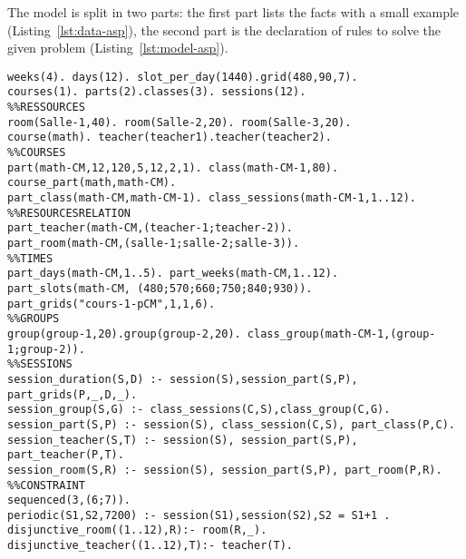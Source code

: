 %
The \ASP{} model is split in two parts: the first part lists the facts with a small example (Listing~\ref{lst:data-asp}), the second part is the declaration of rules to solve the given \UTP{} problem (Listing~\ref{lst:model-asp}).
\begin{lstlisting}[style=PrologStyle, caption={ASP facts}, label={lst:data-asp}]
%%DIMENSIONS
weeks(4). days(12). slot_per_day(1440).grid(480,90,7).
courses(1). parts(2).classes(3). sessions(12).
%%RESSOURCES
room(Salle-1,40). room(Salle-2,20). room(Salle-3,20). 
course(math). teacher(teacher1).teacher(teacher2).
%%COURSES
part(math-CM,12,120,5,12,2,1). class(math-CM-1,80). course_part(math,math-CM).
part_class(math-CM,math-CM-1). class_sessions(math-CM-1,1..12).
%%RESOURCESRELATION
part_teacher(math-CM,(teacher-1;teacher-2)).
part_room(math-CM,(salle-1;salle-2;salle-3)).
%%TIMES
part_days(math-CM,1..5). part_weeks(math-CM,1..12).
part_slots(math-CM, (480;570;660;750;840;930)).
part_grids("cours-1-pCM",1,1,6).
%%GROUPS
group(group-1,20).group(group-2,20). class_group(math-CM-1,(group-1;group-2)).
%%SESSIONS
session_duration(S,D) :- session(S),session_part(S,P), part_grids(P,_,D,_).
session_group(S,G) :- class_sessions(C,S),class_group(C,G).
session_part(S,P) :- session(S), class_session(C,S), part_class(P,C).
session_teacher(S,T) :- session(S), session_part(S,P), part_teacher(P,T).
session_room(S,R) :- session(S), session_part(S,P), part_room(P,R).
%%CONSTRAINT
sequenced(3,(6;7)).
periodic(S1,S2,7200) :- session(S1),session(S2),S2 = S1+1 .
disjunctive_room((1..12),R):- room(R,_).
disjunctive_teacher((1..12),T):- teacher(T).
\end{lstlisting}
\newpage
